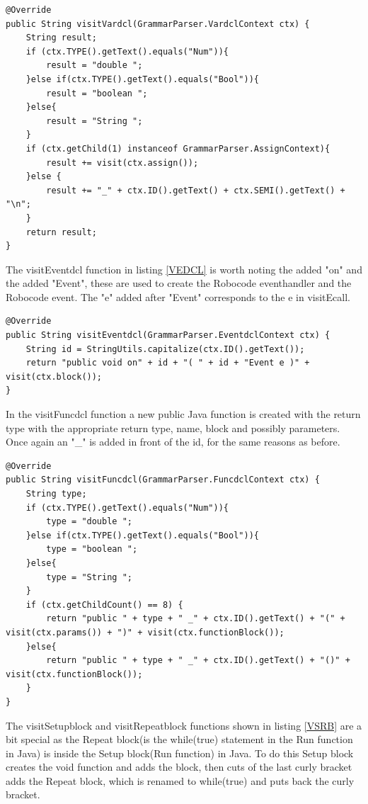 \begin{lstlisting}[caption={CodeGen - visitVardcl function}, label={VVDCL}]
@Override
public String visitVardcl(GrammarParser.VardclContext ctx) {
    String result;
    if (ctx.TYPE().getText().equals("Num")){
        result = "double ";
    }else if(ctx.TYPE().getText().equals("Bool")){
        result = "boolean ";
    }else{
        result = "String ";
    }
    if (ctx.getChild(1) instanceof GrammarParser.AssignContext){
        result += visit(ctx.assign());
    }else {
        result += "_" + ctx.ID().getText() + ctx.SEMI().getText() + "\n";
    }
    return result;
}
\end{lstlisting}

The visitEventdcl function in listing \ref{VEDCL} is worth noting the added "on"  and the added "Event", these are used to create the Robocode eventhandler and the Robocode event. The "e" added after "Event" corresponds to the e in visitEcall.

\begin{lstlisting}[caption={CodeGen - visitEventdcl function}, label={VEDCL}]
@Override
public String visitEventdcl(GrammarParser.EventdclContext ctx) {
    String id = StringUtils.capitalize(ctx.ID().getText());
    return "public void on" + id + "( " + id + "Event e )" + visit(ctx.block());
}
\end{lstlisting}

In the visitFuncdcl function  a new public Java function is created with the return type with the appropriate return type, name, block and possibly parameters. Once again an "\_" is added in front of the id, for the same reasons as before.

\begin{lstlisting}[caption={CodeGen - visitFuncdcl function}, label={VFDCL}]
@Override
public String visitFuncdcl(GrammarParser.FuncdclContext ctx) {
    String type;
    if (ctx.TYPE().getText().equals("Num")){
        type = "double ";
    }else if(ctx.TYPE().getText().equals("Bool")){
        type = "boolean ";
    }else{
        type = "String ";
    }
    if (ctx.getChildCount() == 8) {
        return "public " + type + " _" + ctx.ID().getText() + "(" + visit(ctx.params()) + ")" + visit(ctx.functionBlock());
    }else{
        return "public " + type + " _" + ctx.ID().getText() + "()" + visit(ctx.functionBlock());
    }
}
\end{lstlisting}

The visitSetupblock and visitRepeatblock functions shown in listing \ref{VSRB} are a bit special as the Repeat block(is the while(true) statement in the Run function in Java) is inside the Setup block(Run function) in Java. To do this Setup block creates the void function and adds the block, then cuts of the last curly bracket adds the Repeat block, which is renamed to while(true) and puts back the curly bracket. 

